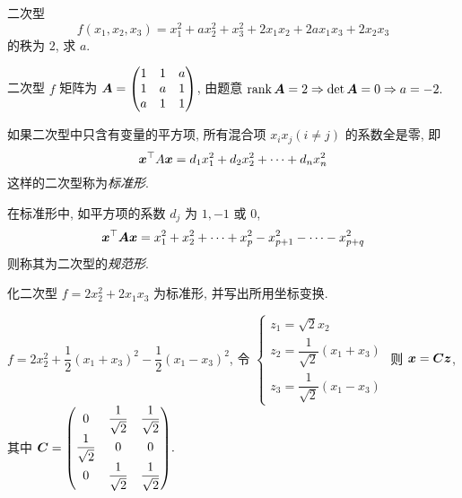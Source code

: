 \begin{example}
    二次型 $$f(x_1,x_2,x_3)=x_1^2+ax_2^2+x_3^2+2x_1x_2+2ax_1x_3+2x_2x_3$$ 的秩为 $2$, 求 $a.$
\end{example}
\begin{solution}
    二次型 $f$ 矩阵为 $\vb*{A}=\mqty(1&1&a\\1&a&1\\a&1&1)$, 由题意 $\rank\vb*{A}=2\Rightarrow \det\vb*{A}=0\Rightarrow a=-2.$
\end{solution}

\begin{definition}[二次型的标准形]
    如果二次型中只含有变量的平方项, 所有混合项 $ x_{i} x_{j}(i \neq j) $ 的系数全是零, 即
    $$\vb*{x}^{\top} A \vb*{x}=d_{1} x_{1}^{2}+d_{2} x_{2}^{2}+\cdots+d_{n} x_{n}^{2}$$
    这样的二次型称为\textit{标准形}.
\end{definition}

\begin{definition}[二次型的规范形]
    在标准形中, 如平方项的系数 $ d_{j} $ 为 $ 1,-1 $ 或 $0$,
    $$\vb*{x}^{\top} \vb*{A} \vb*{x}=x_{1}^{2}+x_{2}^{2}+\cdots+x_{p}^{2}-x_{p+1}^{2}-\cdots-x_{p+q}^{2}$$
    则称其为二次型的\textit{规范形}.
\end{definition}

\begin{example}
    化二次型 $f=2x_2^2+2x_1x_3$ 为标准形, 并写出所用坐标变换.
\end{example}
\begin{solution}
    $f=2x_2^2+\dfrac{1}{2}(x_1+x_3)^2-\dfrac{1}{2}(x_1-x_3)^2$, 令
    $\begin{cases}
            z_1=\sqrt2x_2                  \\
            z_2=\dfrac{1}{\sqrt2}(x_1+x_3) \\[6pt]
            z_3=\dfrac{1}{\sqrt2}(x_1-x_3)
        \end{cases}$ 则 $\vb*{x}=\vb*{Cz}$, 
    其中 $\vb*{C}=\mqty(0&\dfrac{1}{\sqrt2}&\dfrac{1}{\sqrt2}\\[6pt]\dfrac{1}{\sqrt2}&0&0\\[6pt]0&\dfrac{1}{\sqrt{2}}&\dfrac{1}{\sqrt{2}}).$
\end{solution}

